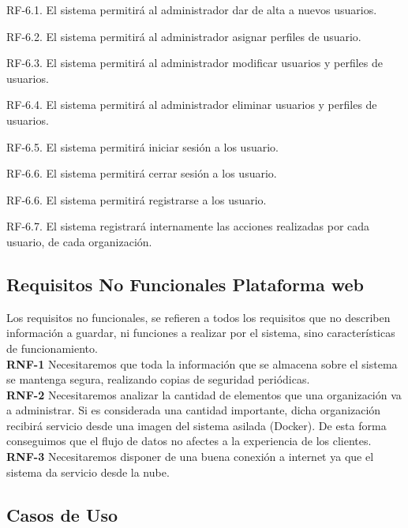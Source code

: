 \documentclass[a4paper,11pt]{book}
\begin{document}
	RF-6.1. El sistema permitirá al administrador dar de alta a nuevos usuarios.
	
	RF-6.2. El sistema permitirá al administrador asignar perfiles de usuario.
	
	RF-6.3. El sistema permitirá al administrador modificar usuarios y perfiles de usuarios.
	
	RF-6.4. El sistema permitirá al administrador eliminar usuarios y perfiles de usuarios.

	RF-6.5. El sistema permitirá iniciar sesión a los usuario.
	
	RF-6.6. El sistema permitirá cerrar sesión a los usuario.
	
	RF-6.6. El sistema permitirá registrarse a los usuario.

	RF-6.7. El sistema registrará internamente las acciones realizadas por cada usuario, de cada organización. \\
	
	

\subsection{Requisitos No Funcionales Plataforma web}
Los requisitos no funcionales, se refieren a todos los requisitos que no describen información a guardar, ni funciones a realizar por el sistema, sino características de funcionamiento.\\


\textbf{RNF-1} Necesitaremos que toda la información que se almacena sobre el sistema se mantenga segura, realizando copias de seguridad periódicas.\\


\textbf{RNF-2} Necesitaremos analizar la cantidad de elementos que una organización va a administrar. Si es considerada una cantidad importante, dicha organización recibirá servicio desde una imagen del sistema asilada (Docker). De esta forma conseguimos que el flujo de datos no afectes a la experiencia de los clientes.\\


\textbf{RNF-3} Necesitaremos disponer de una buena conexión a internet ya que el sistema da servicio desde la nube.\\ 



\subsection{Casos de Uso}
\end{document}
